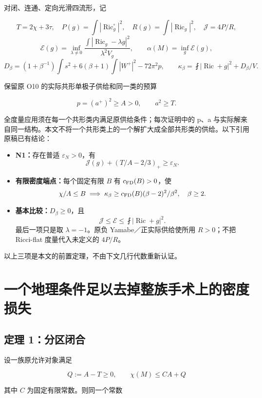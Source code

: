 \documentclass[UTF8,11pt,openany,fontset=none]{ctexbook}
\providecommand{\tightlist}{\setlength{\itemsep}{0pt}\setlength{\parskip}{0pt}}
\theoremstyle{definition}
\theoremstyle{remark}
\begin{document}
对闭、连通、定向光滑四流形，记

\[
T=2\chi+3\tau,\quad
P(g)=\int|\operatorname{Ric}^{\circ}_g|^2,\quad
R(g)=\int|\operatorname{Ric}_g|^2,
\quad\mathcal J=4P/R,
\] \[
\mathcal E(g)=\inf_{\lambda\ne0}
\frac{\int|\operatorname{Ric}_g-\lambda g|^2}{\lambda^2V_g},
\qquad \alpha(M)=\inf_g\mathcal E(g),
\] \[
D_\beta=(1+\beta^{-1})\int s^2
+6(\beta+1)\int|W^+|^2-72\pi^2p,
\qquad
\kappa_\beta=\fint|\operatorname{Ric}+g|^2+D_\beta/V.
\]

保留原 O10 的实际共形单极子供给和同一类的预算

\[
p=(a^+)^2\ge A>0,\qquad a^2\ge T.
\]

全度量应用须在每一个共形类内满足原供给条件；每次证明中的 p、a 与实际解来自同一结构。本文不将一个共形类上的一个解扩大成全部共形类的供给。以下引用原稿已有结论：

\begin{itemize}
\tightlist
\item
  \textbf{N1：}存在普适 \(\varepsilon_N>0\)，有 \[
  \mathcal J(g)+(T/A-2/3)_+\ge\varepsilon_N.
  \]
\item
  \textbf{有限密度端点：}每个固定有限 \(B\) 有 \(c_{\rm FD}(B)>0\)，使 \[
  \chi/A\le B\implies
  \kappa_\beta\ge c_{\rm FD}(B)(\beta-2)^2/\beta^2,
  \quad\beta\ge2.
  \]
\item
  \textbf{基本比较：}\(D_\beta\ge0\)，且 \[
  \mathcal J\le\mathcal E\le\fint|\operatorname{Ric}+g|^2.
  \] 最后一项只是取 \(\lambda=-1\)。原负 Yamabe／正实际供给使所用 \(R>0\)；不把 Ricci-flat 度量代入未定义的 \(4P/R\)。
\end{itemize}

以上三项是本文的前置定理，不由下文几行代数重新认证。

\section{一个地理条件足以去掉整族手术上的密度损失}\label{v4-ux4e00ux4e2aux5730ux7406ux6761ux4ef6ux8db3ux4ee5ux53bbux6389ux6574ux65cfux624bux672fux4e0aux7684ux5bc6ux5ea6ux635fux5931}

\subsection{定理 1：分区闭合}\label{v4-ux5b9aux7406-1ux5206ux533aux95edux5408}

设一族原允许对象满足

\[
Q:=A-T\ge0,\qquad \chi(M)\le C A+Q
\tag{4.2.1}
\]

其中 \(C\) 为固定有限常数。则同一个常数
\end{document}
